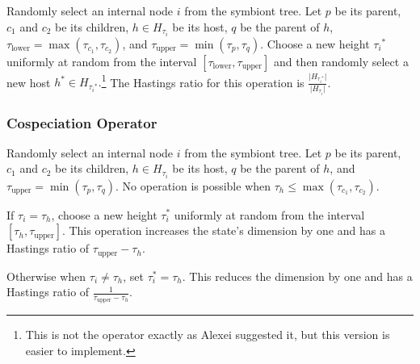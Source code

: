 \documentclass{article}
\begin{document}
                Randomly select an internal node $i$ from the symbiont tree. 
                Let $p$ be its parent, $c_1$ and $c_2$ be its children, $h \in 
                H_{\tau_i}$ be its host, $q$ be the parent of $h$, 
                $\tau_\text{lower} = \max\left(\tau_{c_1},\tau_{c_2}\right)$, 
                and $\tau_\text{upper} = \min\left(\tau_p,\tau_q\right)$. 
                Choose a new height ${\tau_i}^*$ uniformly at random from 
                the interval $\left[\tau_\text{lower}, 
                \tau_\text{upper}\right]$ and then randomly select a new host 
                $h^* \in H_{{\tau_i}^*}.$\footnote{This is not the operator 
                exactly as Alexei suggested it, but this version is easier to 
                implement.} The Hastings ratio for this operation is 
                $\frac{\lvert{H_{{\tau_i}^*}}\rvert}
                {\lvert{H_{\tau_i}}\rvert}$.

            \subsubsection*{Cospeciation Operator}
                
                Randomly select an internal node $i$ from the symbiont tree.
                Let $p$ be its parent, $c_1$ and $c_2$ be its children, $h \in 
                H_{\tau_i}$ be its host, $q$ be the parent of $h$, and 
                $\tau_\text{upper} = \min\left(\tau_p,\tau_q\right)$. No 
                operation is possible when $\tau_h \leq 
                \max\left(\tau_{c_1},\tau_{c_2}\right)$.
               
                If $\tau_i = \tau_h$, choose a new height $\tau_i^*$ uniformly 
                at random from the interval $\left[\tau_h, 
                \tau_\text{upper}\right]$. This operation increases the state's 
                dimension by one and has a Hastings ratio of $\tau_\text{upper} 
                - \tau_h$.
               
                Otherwise when $\tau_i \neq \tau_h$, set $\tau_i^* = \tau_h$. 
                This reduces the dimension by one and has a Hastings ratio of 
                $\frac{1}{\tau_\text{upper} - \tau_h}$.
\end{document}
